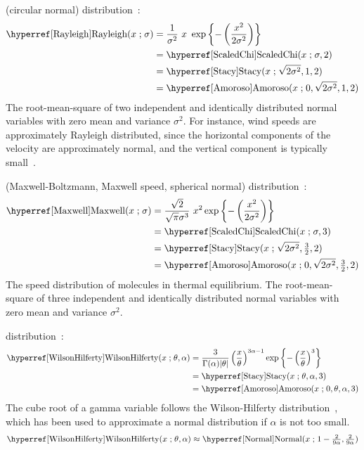  (circular normal) distribution~\cite{Strutt1880,Johnson1994}:
%
\begin{align}
\label{Rayleigh}
\opr{Rayleigh}(x \given \sigma) 
&= \frac{1}{\sigma^2 }\ x\  \exp\left\{-\left(\frac{x^2}{2 \sigma^2}\right)\right\}  \checked
\\
&=\opr{ScaledChi}(x \given \sigma, 2) \notag 							\checked \\
&=  \opr{Stacy}(x\given  \sqrt{2\sigma^2} ,1,2) \notag					\checked \\
&=  \opr{Amoroso}(x\given  0, \sqrt{2\sigma^2} , 1, 2) 					\checked \notag 
\end{align}
 The root-mean-square of two independent and identically distributed normal variables with zero mean and variance $\sigma^2$. 
 For instance, wind speeds are approximately Rayleigh distributed, since the horizontal components of the velocity are approximately normal, and the vertical component is typically small~\cite{Justus1978}. 


 (Maxwell-Boltzmann, Maxwell speed, spherical normal) distribution~\cite{Maxwell1860, Abramowitz1965}:
%
\begin{align}
\label{Maxwell}
\opr{Maxwell}(x \given \sigma) 
&= \frac{\sqrt{2}}{\sqrt{\pi} \sigma^3}\ x^2 \exp\left\{-\left(\frac{x^2}{2\sigma^2}\right)\right\}  \checked
 \\
&=\opr{ScaledChi}(x \given \sigma, 3) \checked \notag \\
&=  \opr{Stacy}(x\given  \sqrt{2\sigma^2} ,\tfrac{3}{2},2) \notag  \checked\\
&=  \opr{Amoroso}(x\given  0, \sqrt{2\sigma^2} , \tfrac{3}{2}, 2) \notag  \checked
\end{align}
The speed distribution of molecules in thermal equilibrium. The root-mean-square of three independent and identically distributed normal variables with zero mean and variance $\sigma^2$.



 distribution~\cite{Wilson1931,Johnson1994}:
\begin{align}
\label{WilsonHilferty}
\opr{WilsonHilferty}(x \given \theta, \alpha) 
&= \frac{3}{\Gamma(\alpha)|\theta|} \left(\frac{x}{\theta}\right)^{3 \alpha-1} \exp\left\{-\left(\frac{x}{\theta}\right)^{3}\right\}
\checked
\\ 
&=  \opr{Stacy}(x\given \theta, \alpha, 3) \checked
\notag 
\\ &=  \opr{Amoroso}(x\given  0, \theta, \alpha, 3) \checked
\notag
\end{align}
The cube root of a gamma variable follows the Wilson-Hilferty distribution~\cite{Wilson1931}, which has been used to approximate a normal distribution if $\alpha$ is not too small.
\[
\opr{WilsonHilferty}(x \given \theta, \alpha)  \approx \opr{Normal}(x \given 1-\sfrac{2}{9\alpha},  \sfrac{2}{9\alpha} )
\checked
\notag
\]


